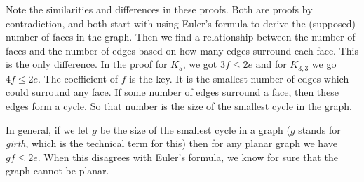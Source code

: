 \documentclass[10pt,]{book}
\theoremstyle{plain}
\theoremstyle{definition}
\theoremstyle{definition}
\theoremstyle{definition}
\theoremstyle{definition}
\numberwithin{equation}{chapter}
\begin{document}
\hypertarget{p-221}{}%
Note the similarities and differences in these proofs. Both are proofs by contradiction, and both start with using Euler's formula to derive the (supposed) number of faces in the graph. Then we find a relationship between the number of faces and the number of edges based on how many edges surround each face. This is the only difference. In the proof for \(K_5\), we got \(3f \le 2e\) and for \(K_{3,3}\) we go \(4f \le 2e\). The coefficient of \(f\) is the key. It is the smallest number of edges which could surround any face. If some number of edges surround a face, then these edges form a cycle. So that number is the size of the smallest cycle in the graph.%
\par
\hypertarget{p-222}{}%
In general, if we let \(g\) be the size of the smallest cycle in a graph (\(g\) stands for \emph{girth}, which is the technical term for this) then for any planar graph we have \(gf \le 2e\). When this disagrees with Euler's formula, we know for sure that the graph cannot be planar.%
\typeout{************************************************}
\typeout{************************************************}
\end{document}
